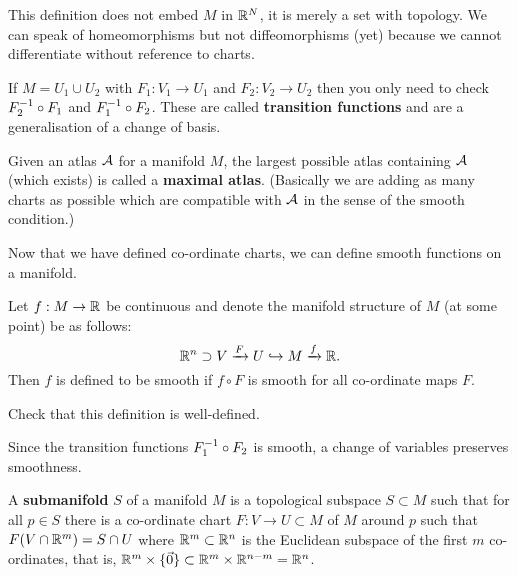 \begin{rmk}
  This definition does not embed $M$ in $\mathbb{R}^N$, it is merely a set with topology.
  We can speak of homeomorphisms but not diffeomorphisms (yet) because we cannot differentiate without reference to charts.
\end{rmk}

\begin{exam}
  If $M = U_1 \cup U_2$ with $F_1: V_1 \to U_1$ and $F_2: V_2 \to U_2$ then you only need to check $F_2^{-1} \circ F_1$ and $F_1^{-1} \circ F_2$.
  These are called \textbf{transition functions} and are a generalisation of a change of basis.
\end{exam}

\begin{rmk}
  Given an atlas $\mathcal{A}$ for a manifold $M$, the largest possible atlas containing $\mathcal{A}$ (which exists) is called a \textbf{maximal atlas}.
  (Basically we are adding as many charts as possible which are compatible with $\mathcal{A}$ in the sense of the smooth condition.)
\end{rmk}

Now that we have defined co-ordinate charts, we can define smooth functions on a manifold.

\begin{defn}
  Let $f: M \to \mathbb{R}$ be continuous and denote the manifold structure of $M$ (at some point) be as follows:
  \[ \mathbb{R}^n \supset V \xrightarrow{F} U \hookrightarrow M \xrightarrow{f} \mathbb{R}. \]
  Then $f$ is defined to be smooth if $f \circ F$ is smooth for all co-ordinate maps $F$.
\end{defn}

\begin{rmk}
  Check that this definition is well-defined.
  
  Since the transition functions $F_1^{-1} \circ F_2$ is smooth, a change of variables preserves smoothness.
\end{rmk}

\begin{defn}[2.2]
  A \textbf{submanifold} $S$ of a manifold $M$ is a topological subspace $S \subset M$ such that for all $p \in S$ there is a co-ordinate chart $F: V \to U \subset M$ of $M$ around $p$ such that $F(V \cap \mathbb{R}^m) = S \cap U$ where $\mathbb{R}^m \subset \mathbb{R}^n$ is the Euclidean subspace of the first $m$ co-ordinates, that is, $\mathbb{R}^m \times \{ \vec 0 \} \subset \mathbb{R}^m \times \mathbb{R}^{n-m} = \mathbb{R}^n$.
\end{defn}

